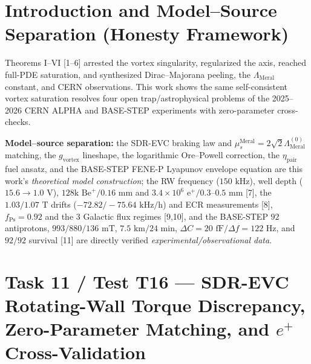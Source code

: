 \documentclass[12pt,a4paper]{article}
\begin{document}
\section{Introduction and Model--Source Separation (Honesty Framework)}

Theorems I--VI [1--6] arrested the vortex singularity, regularized the axis, reached full-PDE saturation, and synthesized Dirac--Majorana peeling, the $\Lambda_{\mathrm{Meral}}$ constant, and CERN observations. This work shows the same self-consistent vortex saturation resolves four open trap/astrophysical problems of the 2025--2026 CERN ALPHA and BASE-STEP experiments with zero-parameter cross-checks.

\textbf{Model--source separation:} the SDR-EVC braking law and $\mu_s^{\mathrm{Meral}}=2\sqrt{2}\Lambda_{\mathrm{Meral}}^{(0)}$ matching, the $g_{\mathrm{vortex}}$ lineshape, the logarithmic Ore--Powell correction, the $\eta_{\mathrm{pair}}$ fuel ansatz, and the BASE-STEP FENE-P Lyapunov envelope equation are this work's \textit{theoretical model construction}; the RW frequency ($150\text{ kHz}$), well depth ($15.6\to1.0\text{ V}$), $128\text{k Be}^+ / 0.16\text{ mm}$ and $3.4\times10^6\text{ e}^+ / 0.3\text{--}0.5\text{ mm}$ [7], the $1.03/1.07\text{ T}$ drifts ($-72.82/-75.64\text{ kHz/h}$) and ECR measurements [8], $f_{\mathrm{Ps}}=0.92$ and the 3 Galactic flux regimes [9,10], and the BASE-STEP $92$ antiprotons, $993/880/136\text{ mT}$, $7.5\text{ km}/24\text{ min}$, $\Delta C=20\text{ fF}/\Delta f=122\text{ Hz}$, and $92/92$ survival [11] are directly verified \textit{experimental/observational data}.

\section[Task 11 / Test T16 --- SDR-EVC Torque Discrepancy, Zero-Parameter Matching, and $e^+$ Cross-Validation]{Task 11 / Test T16 --- SDR-EVC Rotating-Wall Torque Discrepancy, \\ Zero-Parameter Matching, and $e^+$ Cross-Validation}
\end{document}
